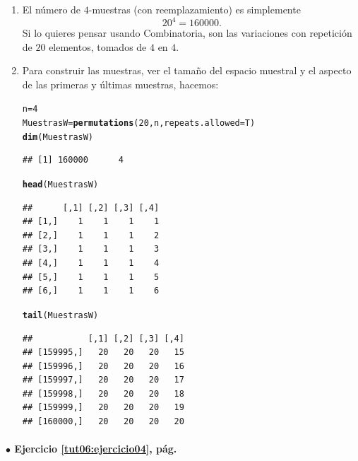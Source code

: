 \documentclass[10pt,a4paper]{article}\usepackage[]{graphicx}\usepackage[]{color}
\makeatletter
\newcommand{\hlnum}[1]{\textcolor[rgb]{0.686,0.059,0.569}{#1}}%
\newcommand{\hlstd}[1]{\textcolor[rgb]{0.345,0.345,0.345}{#1}}%
\newcommand{\hlkwb}[1]{\textcolor[rgb]{0.69,0.353,0.396}{#1}}%
\newcommand{\hlkwc}[1]{\textcolor[rgb]{0.333,0.667,0.333}{#1}}%
\newcommand{\hlkwd}[1]{\textcolor[rgb]{0.737,0.353,0.396}{\textbf{#1}}}%
\newenvironment{kframe}{%
 \def\at@end@of@kframe{}%
 \ifinner\ifhmode%
  \def\at@end@of@kframe{\end{minipage}}%
  \begin{minipage}{\columnwidth}%
 \fi\fi%
 \def\FrameCommand##1{\hskip\@totalleftmargin \hskip-\fboxsep
 \colorbox{shadecolor}{##1}\hskip-\fboxsep
     \hskip-\linewidth \hskip-\@totalleftmargin \hskip\columnwidth}%
 \MakeFramed {\advance\hsize-\width
   \@totalleftmargin\z@ \linewidth\hsize
   \@setminipage}}%
 {\par\unskip\endMakeFramed%
 \at@end@of@kframe}
\newenvironment{knitrout}{}{} %
\makeatother
\begin{document}
\begin{enumerate}
  \item El número de $4$-muestras (con reemplazamiento) es simplemente
  \[20^4 = 160000.\]
  Si lo quieres pensar usando Combinatoria, son las variaciones con repetición de $20$ elementos, tomados de $4$ en $4$.
  \item Para construir las muestras, ver el tamaño del espacio muestral y el aspecto de las primeras y últimas muestras, hacemos:
\begin{knitrout}
\color{fgcolor}\begin{kframe}
\begin{alltt}
\hlstd{n} \hlkwb{=} \hlnum{4}
\hlstd{MuestrasW} \hlkwb{=} \hlkwd{permutations}\hlstd{(}\hlnum{20}\hlstd{, n,} \hlkwc{repeats.allowed}\hlstd{=T)}
\hlkwd{dim}\hlstd{(MuestrasW)}
\end{alltt}
\begin{verbatim}
## [1] 160000      4
\end{verbatim}
\begin{alltt}
\hlkwd{head}\hlstd{(MuestrasW)}
\end{alltt}
\begin{verbatim}
##      [,1] [,2] [,3] [,4]
## [1,]    1    1    1    1
## [2,]    1    1    1    2
## [3,]    1    1    1    3
## [4,]    1    1    1    4
## [5,]    1    1    1    5
## [6,]    1    1    1    6
\end{verbatim}
\begin{alltt}
\hlkwd{tail}\hlstd{(MuestrasW)}
\end{alltt}
\begin{verbatim}
##           [,1] [,2] [,3] [,4]
## [159995,]   20   20   20   15
## [159996,]   20   20   20   16
## [159997,]   20   20   20   17
## [159998,]   20   20   20   18
## [159999,]   20   20   20   19
## [160000,]   20   20   20   20
\end{verbatim}
\end{kframe}
\end{knitrout}
\end{enumerate}

\paragraph{\bf $\bullet$ Ejercicio \ref{tut06:ejercicio04}, pág. \pageref{tut06:ejercicio04}}
\label{tut06:ejercicio04:sol}\quad\\
\end{document}
